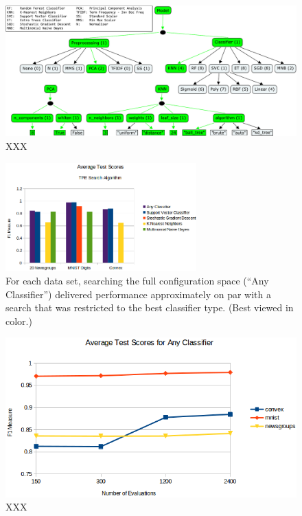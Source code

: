 \documentclass[wcp]{jmlr}
\begin{document}
\begin{figure}
    \centering
    \includegraphics[width=\textwidth]{graphics/sklearn_space_all_together}
    \caption{
	    XXX
    }
    \label{fig:space}
\end{figure}
\begin{figure}
    \centering
    \includegraphics[width=2.90in]{graphics/AverageTestScoresClassifiersTPE}
    \caption{
        For each data set, searching the full configuration space (``Any Classifier'') delivered performance approximately on par with a search that was restricted to the best classifier type.
        (Best viewed in color.)
    }
    \label{fig:avg_test_scores}
\end{figure}

\begin{figure}
    \centering
    \includegraphics[width=\textwidth]{graphics/scores_by_classifier}
    \caption{
	    XXX
    }
    \label{fig:per_clf}
\end{figure}
\end{document}
